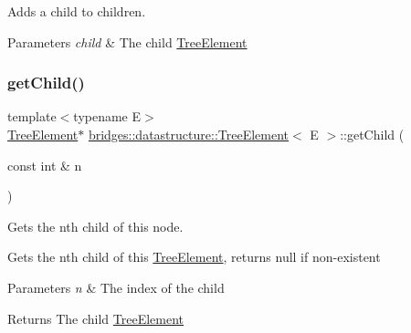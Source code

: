 Adds a child to children. 


\begin{DoxyParams}{Parameters}
{\em child} & The child \hyperlink{classbridges_1_1datastructure_1_1_tree_element}{Tree\+Element} \\
\hline
\end{DoxyParams}
\mbox{\label{classbridges_1_1datastructure_1_1_tree_element_a7b4c553cd11b169fa4ab5c3dacc371a1}} 
\subsubsection{\texorpdfstring{get\+Child()}{getChild()}\hspace{0.1cm}{\footnotesize\ttfamily [1/2]}}
{\footnotesize\ttfamily template$<$typename E$>$ \\
\hyperlink{classbridges_1_1datastructure_1_1_tree_element}{Tree\+Element}$\ast$ \hyperlink{classbridges_1_1datastructure_1_1_tree_element}{bridges\+::datastructure\+::\+Tree\+Element}$<$ E $>$\+::get\+Child (\begin{DoxyParamCaption}\item[{const int \&}]{n }\end{DoxyParamCaption})\hspace{0.3cm}{\ttfamily [inline]}}



Gets the nth child of this node. 

Gets the nth child of this \hyperlink{classbridges_1_1datastructure_1_1_tree_element}{Tree\+Element}, returns null if non-\/existent


\begin{DoxyParams}{Parameters}
{\em n} & The index of the child \\
\hline
\end{DoxyParams}
\begin{DoxyReturn}{Returns}
The child \hyperlink{classbridges_1_1datastructure_1_1_tree_element}{Tree\+Element} 
\end{DoxyReturn}
\mbox{\label{classbridges_1_1datastructure_1_1_tree_element_a858d9ce29eb7256d058e8ee2daf4ef4f}} 
